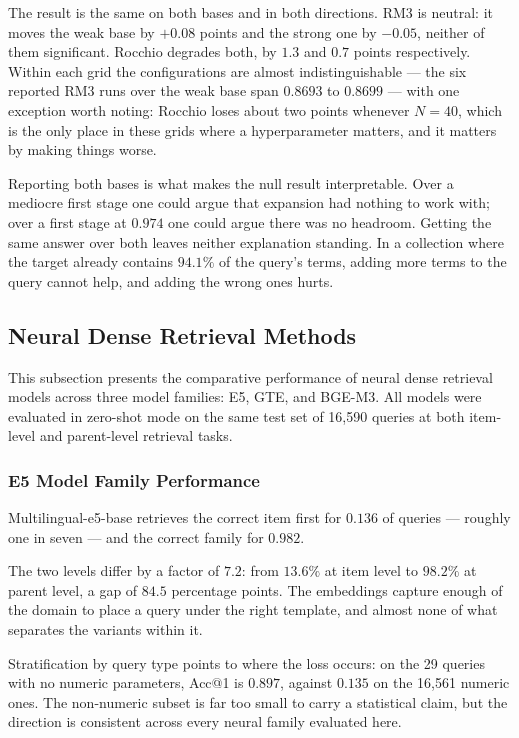 \documentclass[preprint,12pt]{elsarticle}
\begin{document}
The result is the same on both bases and in both directions. RM3 is neutral: it moves the weak base by $+0.08$ points and the strong one by $-0.05$, neither of them significant. Rocchio degrades both, by $1.3$ and $0.7$ points respectively. Within each grid the configurations are almost indistinguishable --- the six reported RM3 runs over the weak base span $0.8693$ to $0.8699$ --- with one exception worth noting: Rocchio loses about two points whenever $N=40$, which is the only place in these grids where a hyperparameter matters, and it matters by making things worse.

Reporting both bases is what makes the null result interpretable. Over a mediocre first stage one could argue that expansion had nothing to work with; over a first stage at $0.974$ one could argue there was no headroom. Getting the same answer over both leaves neither explanation standing. In a collection where the target already contains $94.1\%$ of the query's terms, adding more terms to the query cannot help, and adding the wrong ones hurts.

\subsection{Neural Dense Retrieval Methods}

This subsection presents the comparative performance of neural dense retrieval models across three model families: E5, GTE, and BGE-M3. All models were evaluated in zero-shot mode on the same test set of 16,590 queries at both item-level and parent-level retrieval tasks.

\subsubsection{E5 Model Family Performance}

Multilingual-e5-base retrieves the correct item first for $0.136$ of queries --- roughly one in seven --- and the correct family for $0.982$.

The two levels differ by a factor of $7.2$: from $13.6\%$ at item level to $98.2\%$ at parent level, a gap of $84.5$ percentage points. The embeddings capture enough of the domain to place a query under the right template, and almost none of what separates the variants within it.

Stratification by query type points to where the loss occurs: on the 29 queries with no numeric parameters, Acc@1 is $0.897$, against $0.135$ on the 16,561 numeric ones. The non-numeric subset is far too small to carry a statistical claim, but the direction is consistent across every neural family evaluated here.
\end{document}

